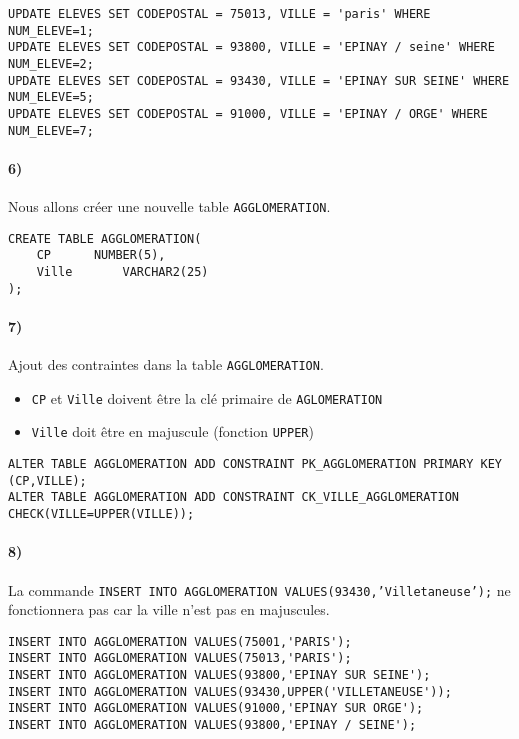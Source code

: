 \documentclass{report}
\begin{document}
\begin{lstlisting}
UPDATE ELEVES SET CODEPOSTAL = 75013, VILLE = 'paris' WHERE NUM_ELEVE=1;
UPDATE ELEVES SET CODEPOSTAL = 93800, VILLE = 'EPINAY / seine' WHERE NUM_ELEVE=2;
UPDATE ELEVES SET CODEPOSTAL = 93430, VILLE = 'EPINAY SUR SEINE' WHERE NUM_ELEVE=5;
UPDATE ELEVES SET CODEPOSTAL = 91000, VILLE = 'EPINAY / ORGE' WHERE NUM_ELEVE=7;
\end{lstlisting}

\paragraph{6)}Nous allons créer une nouvelle table {\tt AGGLOMERATION}.

\begin{lstlisting}
CREATE TABLE AGGLOMERATION(
	CP		NUMBER(5),
	Ville		VARCHAR2(25)
);
\end{lstlisting}

\paragraph{7)}Ajout des contraintes dans la table {\tt AGGLOMERATION}.
\begin{itemize}
 \item {\tt CP} et {\tt Ville} doivent être la clé primaire de {\tt AGLOMERATION}
 \item {\tt Ville} doit être en majuscule (fonction {\tt UPPER})
\end{itemize}

\begin{lstlisting}
ALTER TABLE AGGLOMERATION ADD CONSTRAINT PK_AGGLOMERATION PRIMARY KEY (CP,VILLE);
ALTER TABLE AGGLOMERATION ADD CONSTRAINT CK_VILLE_AGGLOMERATION CHECK(VILLE=UPPER(VILLE));
\end{lstlisting}

\paragraph{8)}La commande {\tt INSERT INTO AGGLOMERATION VALUES(93430,'Villetaneuse');} ne fonctionnera pas car la ville n'est pas en majuscules.

\begin{lstlisting}
INSERT INTO AGGLOMERATION VALUES(75001,'PARIS');
INSERT INTO AGGLOMERATION VALUES(75013,'PARIS');
INSERT INTO AGGLOMERATION VALUES(93800,'EPINAY SUR SEINE');
INSERT INTO AGGLOMERATION VALUES(93430,UPPER('VILLETANEUSE'));
INSERT INTO AGGLOMERATION VALUES(91000,'EPINAY SUR ORGE');
INSERT INTO AGGLOMERATION VALUES(93800,'EPINAY / SEINE');
\end{lstlisting}
\end{document}

